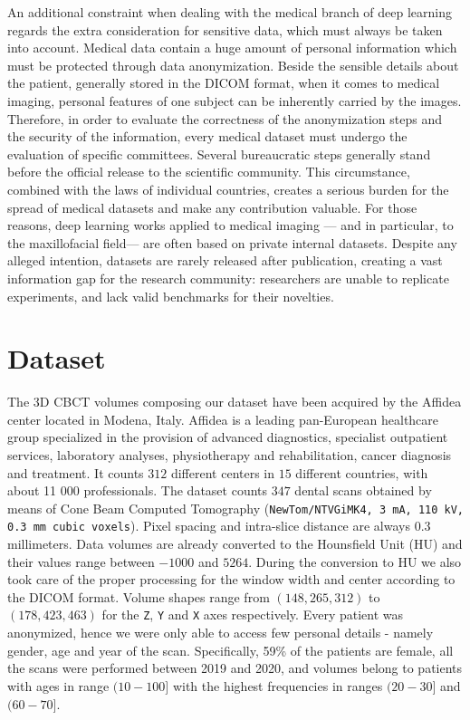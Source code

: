 An additional constraint when dealing with the medical branch of deep learning
regards the extra consideration for sensitive data, which must always be taken
into account. Medical data contain a huge amount of personal information which
must be protected through data anonymization. Beside the sensible details about
the patient, generally stored in the DICOM format, when it comes to medical
imaging, personal features of one subject can be inherently carried by the
images. Therefore, in order to evaluate the correctness of the anonymization
steps and the security of the information, every medical dataset must undergo
the evaluation of specific committees. Several bureaucratic steps generally
stand before the official release to the scientific community. This
circumstance, combined with the laws of individual countries, creates a serious
burden for the spread of medical datasets and make any contribution valuable.
For those reasons, deep learning works applied to medical imaging — and in
particular, to the maxillofacial field— are often based on private internal
datasets. Despite any alleged intention, datasets are rarely released after
publication, creating a vast information gap for the research community:
researchers are unable to replicate experiments, and lack valid benchmarks for
their novelties.

\section{Dataset}
The 3D CBCT volumes composing our dataset have been acquired by the Affidea
center located in Modena, Italy. Affidea is a leading pan-European healthcare
group specialized in the provision of advanced diagnostics, specialist
outpatient services, laboratory analyses, physiotherapy and rehabilitation,
cancer diagnosis and treatment. It counts $312$ different centers in $15$ different
countries, with about 11 000 professionals. The dataset counts $347$ dental scans
obtained by means of Cone Beam Computed Tomography (\texttt{NewTom/NTVGiMK4, 3 mA, 110
kV, 0.3 mm cubic voxels}). Pixel spacing and intra-slice distance are always $0.3$
millimeters. Data volumes are already converted to the Hounsfield Unit (HU) and
their values range between $-1000$ and $5264$. During the conversion to HU we also
took care of the proper processing for the window width and center according to
the DICOM format.
Volume shapes range from $(148, 265, 312)$ to $(178, 423, 463)$ for the
\texttt{Z}, \texttt{Y} and \texttt{X} axes respectively.
Every patient was anonymized, hence we were only able to access few personal
details - namely gender, age and year of the scan. Specifically, 59\% of the
patients are female, all the scans were performed between 2019 and 2020, and
volumes belong to patients with ages in range $(10-100]$ with the highest
frequencies in ranges $(20-30]$ and $(60-70]$.

